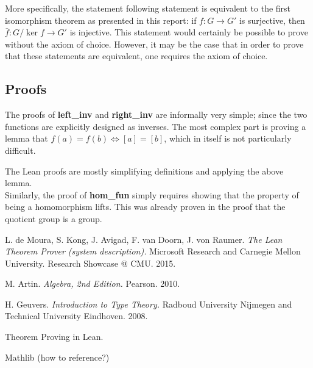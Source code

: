 \documentclass[runningheads,a4paper]{llncs}
\renewcommand{\-}{\setminus}
\begin{document}
More specifically, the statement following statement is equivalent to the first isomorphism theorem as presented in this report: if $f : G \to G'$ is surjective, then $\bar f : G / \ker f \to G'$ is injective. This statement would certainly be possible to prove without the axiom of choice. However, it may be the case that in order to prove that these statements are equivalent, one requires the axiom of choice.

\subsection{Proofs}

The proofs of \textbf{left\_inv} and \textbf{right\_inv} are informally very simple; since the two functions are explicitly designed as inverses. The most complex part is proving a lemma that $f(a) = f(b) \iff [a] = [b]$, which in itself is not particularly difficult.

The Lean proofs are mostly simplifying definitions and applying the above lemma.\\

Similarly, the proof of \textbf{hom\_fun} simply requires showing that the property of being a homomorphism lifts. This was already proven in the proof that the quotient group is a group.

\begin{thebibliography}{1}

 L. de Moura, S. Kong, J. Avigad, F. van Doorn, J. von Raumer. {\em The Lean Theorem Prover (system description).} Microsoft Research and Carnegie Mellon University. Research Showcase @ CMU. 2015.

 M. Artin. {\em Algebra, 2nd Edition.} Pearson. 2010.

 H. Geuvers. {\em Introduction to Type Theory.} Radboud University Nijmegen and Technical University Eindhoven. 2008.

 Theorem Proving in Lean.

 Mathlib (how to reference?)

\end{thebibliography}
\end{document}
